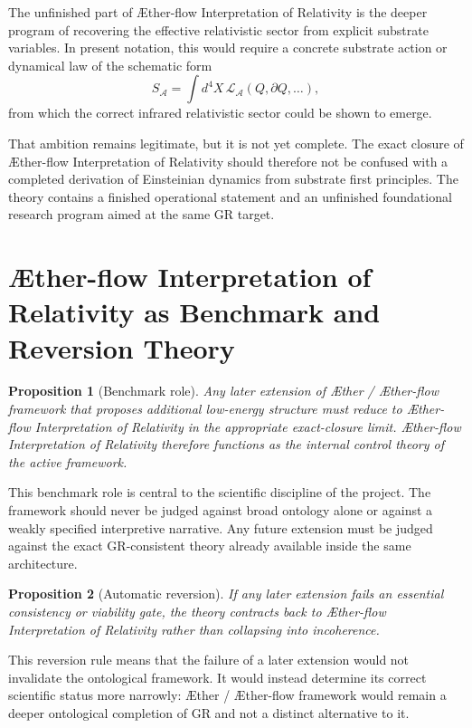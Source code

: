\documentclass[11pt]{article}
\newcommand{\Aether}{\AE{}ther}
\newcommand{\Aflow}{\AE{}ther-flow}
\newcommand{\TheoryName}{\Aflow{} Interpretation of Relativity}
\newcommand{\TheoryProgram}{\Aether{} / \Aflow{} framework}
\newtheorem{proposition}{Proposition}
\begin{document}
The unfinished part of \TheoryName{} is the deeper program of recovering the effective relativistic sector from explicit substrate variables. In present notation, this would require a concrete substrate action or dynamical law of the schematic form
\begin{equation}
S_{\mathcal A}
=
\int d^4X\,\mathcal L_{\mathcal A}(Q,\partial Q,\ldots),
\label{eq:substrateaction}
\end{equation}
from which the correct infrared relativistic sector could be shown to emerge.

That ambition remains legitimate, but it is not yet complete. The exact closure of \TheoryName{} should therefore not be confused with a completed derivation of Einsteinian dynamics from substrate first principles. The theory contains a finished operational statement and an unfinished foundational research program aimed at the same GR target.

\section{\TheoryName{} as Benchmark and Reversion Theory}

\begin{proposition}[Benchmark role]
Any later extension of \TheoryProgram{} that proposes additional low-energy structure must reduce to \TheoryName{} in the appropriate exact-closure limit. \TheoryName{} therefore functions as the internal control theory of the active framework.
\end{proposition}

This benchmark role is central to the scientific discipline of the project. The framework should never be judged against broad ontology alone or against a weakly specified interpretive narrative. Any future extension must be judged against the exact GR-consistent theory already available inside the same architecture.

\begin{proposition}[Automatic reversion]
If any later extension fails an essential consistency or viability gate, the theory contracts back to \TheoryName{} rather than collapsing into incoherence.
\end{proposition}

This reversion rule means that the failure of a later extension would not invalidate the ontological framework. It would instead determine its correct scientific status more narrowly: \TheoryProgram{} would remain a deeper ontological completion of GR and not a distinct alternative to it.
\end{document}
